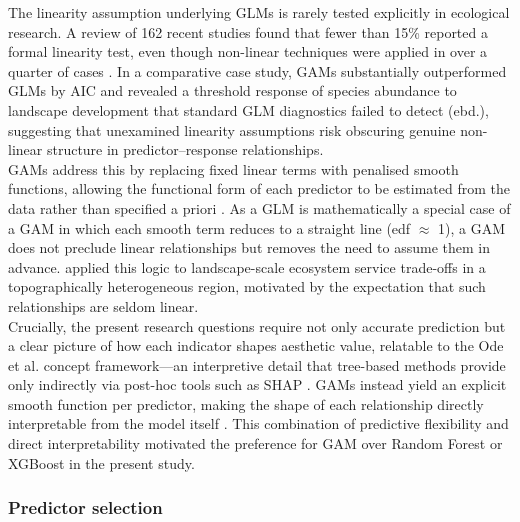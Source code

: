 \documentclass[hidelinks, 11pt]{article}
\begin{document}
The linearity assumption underlying GLMs is rarely tested explicitly in ecological research. A review of 162 recent studies found that fewer than 15\% reported a formal linearity test, even though non-linear techniques were applied in over a quarter of cases \citep{heit_generalized_2024}. In a comparative case study, GAMs substantially outperformed GLMs by AIC and revealed a threshold response of species abundance to landscape development that standard GLM diagnostics failed to detect (ebd.), suggesting that unexamined linearity assumptions risk obscuring genuine non-linear structure in predictor--response relationships.
\\
GAMs address this by replacing fixed linear terms with penalised smooth functions, allowing the functional form of each predictor to be estimated from the data rather than specified a priori \citep{wood_generalized_2017,pedersen_hierarchical_2019}. As a GLM is mathematically a special case of a GAM in which each smooth term reduces to a straight line (edf $\approx$ 1), a GAM does not preclude linear relationships but removes the need to assume them in advance. \citet{huang_generalized_2022} applied this logic to landscape-scale ecosystem service trade-offs in a topographically heterogeneous region, motivated by the expectation that such relationships are seldom linear.
\\
Crucially, the present research questions require not only accurate prediction but a clear picture of how each indicator shapes aesthetic value, relatable to the Ode et al. concept framework---an interpretive detail that tree-based methods provide only indirectly via post-hoc tools such as SHAP \citep{comalada_modelling_2025}. GAMs instead yield an explicit smooth function per predictor, making the shape of each relationship directly interpretable from the model itself \citep{wood_generalized_2017,pedersen_hierarchical_2019}. This combination of predictive flexibility and direct interpretability motivated the preference for GAM over Random Forest or XGBoost in the present study.

\subsubsection{Predictor selection}
\end{document}
